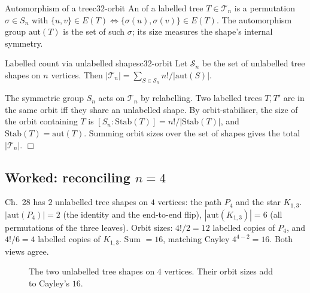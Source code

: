 \begin{definition}{Automorphism of a tree}{c32-orbit}
An  of a labelled tree \(T\in\mathcal{T}_n\) is a
permutation \(\sigma\in S_n\) with \(\{u,v\}\in E(T)\iff \{\sigma(u),
\sigma(v)\}\in E(T)\).  The automorphism group \(\mathrm{aut}(T)\) is the
set of such \(\sigma\); its size measures the shape's internal symmetry.
\end{definition}

\begin{theorem}{Labelled count via unlabelled shapes}{c32-orbit}
Let \(\mathcal{S}_n\) be the set of unlabelled tree shapes on \(n\) vertices.
Then \(|\mathcal{T}_n|=\sum_{S\in\mathcal{S}_n} n!/|\mathrm{aut}(S)|\).
\end{theorem}

\begin{proofbox}
The symmetric group \(S_n\) acts on \(\mathcal{T}_n\) by relabelling.  Two
labelled trees \(T,T'\) are in the same orbit iff they share an unlabelled
shape.  By orbit-stabiliser, the size of the orbit containing \(T\) is
\([S_n:\mathrm{Stab}(T)]=n!/|\mathrm{Stab}(T)|\), and \(\mathrm{Stab}(T)=
\mathrm{aut}(T)\).  Summing orbit sizes over the set of shapes gives the
total \(|\mathcal{T}_n|\). \(\Box\)
\end{proofbox}

\subsection*{Worked: reconciling \(n=4\)}

Ch.~28 has \(2\) unlabelled tree shapes on \(4\) vertices: the path \(P_4\)
and the star \(K_{1,3}\).  \(|\mathrm{aut}(P_4)|=2\) (the identity and the
end-to-end flip), \(|\mathrm{aut}(K_{1,3})|=6\) (all permutations of the
three leaves).  Orbit sizes: \(4!/2 = 12\) labelled copies of \(P_4\), and
\(4!/6 = 4\) labelled copies of \(K_{1,3}\).  Sum \(=16\), matching Cayley
\(4^{4-2}=16\).  Both views agree.

\begin{figure}[H]
\centering
{}
\caption{The two unlabelled tree shapes on \(4\) vertices.  Their orbit
sizes add to Cayley's \(16\).}
\label{fig:c32-orbit}
\end{figure}

